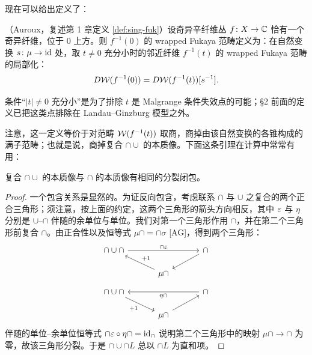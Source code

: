 
现在可以给出定义了：

\begin{defstar}（Auroux，复述第 1 章定义 \ref{def:sing-fuk}）\quad 设奇异辛纤维丛 $f\colon X\to\mathbb{C}$ 恰有一个奇异纤维，位于 $0$ 上方。则 $f^{-1}(0)$ 的 wrapped Fukaya 范畴定义为：在自然变换 $s\colon\mu\to\mathrm{id}$ 处，取 $t\neq0$ 充分小时的邻近纤维 $f^{-1}(t)$ 的 wrapped Fukaya 范畴的局部化：
\[
D\mathcal{W}(f^{-1}(0))=D\mathcal{W}(f^{-1}(t))[s^{-1}].
\]
\end{defstar}


条件“$|t|\neq0$ 充分小”是为了排除 $t$ 是 Malgrange 条件失效点的可能；§2 前面的定义已把这类点排除在 Landau--Ginzburg 模型之外。

注意，这一定义等价于对范畴 $\mathcal{W}(f^{-1}(t))$ 取商，商掉由该自然变换的各锥构成的满子范畴；也就是说，商掉复合 $\cap\cup$ 的本质像。下面这条引理在计算中常常有用：

\begin{lemma}\label{lem:essential-image}\label{lem:2-3-1}
复合 $\cap\cup$ 的本质像与 $\cap$ 的本质像有相同的分裂闭包。
\end{lemma}

\begin{proof}
一个包含关系是显然的。为证反向包含，考虑联系 $\cap$ 与 $\cup$ 之复合的两个正合三角形；须注意，按上面的约定，这两个三角形的箭头方向相反，其中 $\varepsilon$ 与 $\eta$ 分别是 $\cup$--$\cap$ 伴随的余单位与单位。我们对第一个三角形作用 $\cap$，并在第二个三角形前复合 $\cap$。由正合性以及恒等式 $\mu\cap=\cap\sigma$ [AG]，得到两个三角形：
\[
\begin{tikzcd}[column sep=3.2em, row sep=1.5em]
\cap\cup\cap \arrow[rr, "\cap\varepsilon"] & & \cap \arrow[dl] \\
& \mu\cap \arrow[ul, "+1"'] &
\end{tikzcd}
\]
\[
\begin{tikzcd}[column sep=3.2em, row sep=1.5em]
\cap\cup\cap \arrow[dr, "+1"'] & & \cap \arrow[ll, "\eta\cap"] \\
& \mu\cap \arrow[ur] &
\end{tikzcd}
\]
伴随的单位–余单位恒等式 $\cap\varepsilon\circ\eta\cap=\mathrm{id}_{\cap}$ 说明第二个三角形中的映射 $\mu\cap\to\cap$ 为零，故该三角形分裂。于是 $\cap\cup\cap L$ 总以 $\cap L$ 为直和项。
\end{proof}


